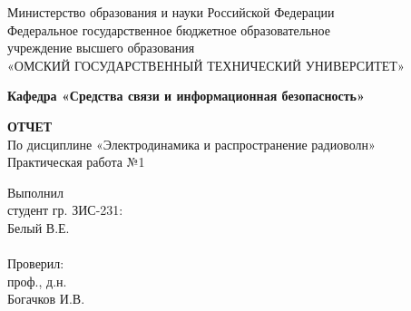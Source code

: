 \documentclass[14pt,a4paper]{scrartcl}
\begin{document}
  \begin{titlepage}                                                         
    \newpage                                                                        
    \begin{center}   
      Министерство образования и науки Российской Федерации  \\ 
      \vspace{1em}                                                    
      {\mdseries
        Федеральное государственное бюджетное образовательное \\
        учреждение высшего образования \\
        «ОМСКИЙ ГОСУДАРСТВЕННЫЙ ТЕХНИЧЕСКИЙ УНИВЕРСИТЕТ»
      }                               
      \vspace{1em}      

      {\bfseries Кафедра «Средства связи и информационная безопасность»}  

      \vspace{\fill}                                                         
                                   
      {\bfseries ОТЧЕТ } \\                                 
      По дисциплине «Электродинамика и распространение радиоволн» \\ 
      \vspace{1em} 
      Практическая работа №1 \\                                                           
    \end{center}                                                          
                                                                                        
    \vspace{\fill}                                                         
                                                                                        
    \hfill\parbox{5cm}{
      Выполнил\\
      студент гр. ЗИС-231:\\
      Белый В.Е. \\
      \\
      Проверил:\\
      проф., д.н. \\
      Богачков И.В.\\
    }                                                                                                                              
                                                                                                                                                                              

\end{titlepage}
\end{document}
